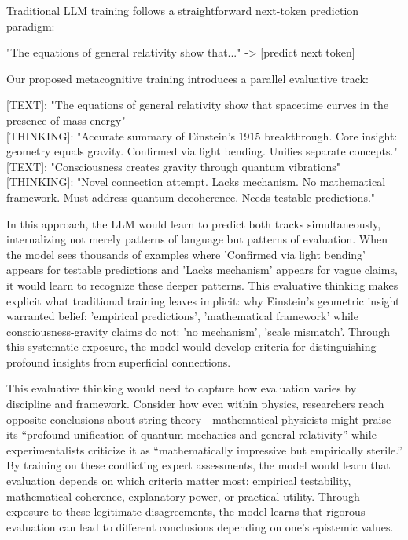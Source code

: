 \documentclass[11pt]{article}
\begin{document}
	Traditional LLM training follows a straightforward next-token prediction paradigm:
	\begin{metabox}
		"The equations of general relativity show that..." -> [predict next token]
	\end{metabox}
	\noindent Our proposed metacognitive training introduces a parallel evaluative track:
	\begin{metabox}
		{[TEXT]}: "The equations of general relativity show that spacetime curves in the presence of mass-energy"\\
		{[THINKING]}: "Accurate summary of Einstein's 1915 breakthrough. Core insight: geometry equals gravity. Confirmed via light bending. Unifies separate concepts."\\[1.5em]
		{[TEXT]}: "Consciousness creates gravity through quantum vibrations"\\
		{[THINKING]}: "Novel connection attempt. Lacks mechanism. No mathematical framework. Must address quantum decoherence. Needs testable predictions."
	\end{metabox}
	\noindent In this approach, the LLM would learn to predict both tracks simultaneously, internalizing not merely patterns of language but patterns of evaluation. When the model sees thousands of examples where 'Confirmed via light bending' appears for testable predictions and 'Lacks mechanism' appears for vague claims, it would learn to recognize these deeper patterns. This evaluative thinking makes explicit what traditional training leaves implicit: why Einstein's geometric insight warranted belief: 'empirical predictions', 'mathematical framework' while consciousness-gravity claims do not: 'no mechanism', 'scale mismatch'. Through this systematic exposure, the model would develop criteria for distinguishing profound insights from superficial connections.
	
	This evaluative thinking would need to capture how evaluation varies by discipline and framework. Consider how even within physics, researchers reach opposite conclusions about string theory---mathematical physicists might praise its ``profound unification of quantum mechanics and general relativity'' while experimentalists criticize it as ``mathematically impressive but empirically sterile.'' By training on these conflicting expert assessments, the model would learn that evaluation depends on which criteria matter most: empirical testability, mathematical coherence, explanatory power, or practical utility. Through exposure to these legitimate disagreements, the model learns that rigorous evaluation can lead to different conclusions depending on one's epistemic values.
	
\end{document}
